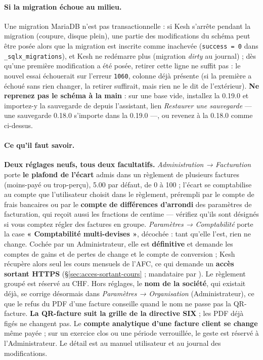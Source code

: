 \documentclass[a4paper,11pt,oneside]{article}
\begin{document}
\paragraph{Si la migration échoue au milieu.} Une migration MariaDB n'est pas transactionnelle : si Kesh s'arrête pendant la migration (coupure, disque plein), une partie des modifications du schéma peut être posée alors que la migration est inscrite comme inachevée (\texttt{success = 0} dans \texttt{\_sqlx\_migrations}), et Kesh ne redémarre plus (migration \emph{dirty} au journal) ; dès qu'une première modification a été posée, retirer cette ligne ne suffit pas : le nouvel essai échouerait sur l'erreur \texttt{1060}, colonne déjà présente (si la première a échoué sans rien changer, la retirer suffirait, mais rien ne le dit de l'extérieur). \textbf{Ne reprenez pas le schéma à la main} : sur une base vide, installez la 0.19.0 et importez-y la sauvegarde de  depuis l'assistant, lien \emph{Restaurer une sauvegarde} --- une sauvegarde 0.18.0 s'importe dans la 0.19.0 ---, ou revenez à la 0.18.0 comme ci-dessus.

\paragraph{Ce qu'il faut savoir.} \textbf{Deux réglages neufs, tous deux facultatifs.} \emph{Administration → Facturation} porte \textbf{le plafond de l'écart} admis dans un règlement de plusieurs factures (moins-payé ou trop-perçu), 5.00 par défaut, de 0 à 100 ; l'écart se comptabilise au compte que l'utilisateur choisit dans le règlement, prérempli par le compte de frais bancaires ou par le \textbf{compte de différences d'arrondi} des paramètres de facturation, qui reçoit aussi les fractions de centime --- vérifiez qu'ils sont désignés si vous comptez régler des factures en groupe. \emph{Paramètres → Comptabilité} porte la case \textbf{« Comptabilité multi-devises »}, décochée : tant qu'elle l'est, rien ne change. Cochée par un Administrateur, elle est \textbf{définitive} et demande les comptes de gains et de pertes de change et le compte de conversion ; Kesh récupère alors seul les cours mensuels de l'AFC, ce qui demande un \textbf{accès sortant HTTPS} (\S\ref{sec:acces-sortant-cours} ; mandataire par ). Le règlement groupé est réservé au CHF. Hors réglages, le \textbf{nom de la société}, qui existait déjà, se corrige désormais dans \emph{Paramètres → Organisation} (Administrateur), ce que le refus du PDF d'une facture conseille quand le nom ne passe pas la QR-facture. \textbf{La QR-facture suit la grille de la directive SIX} ; les PDF déjà figés ne changent pas. Le \textbf{compte analytique d'une facture client se change} même payée ; sur un exercice clos ou une période verrouillée, le geste est réservé à l'Administrateur. Le détail est au manuel utilisateur et au journal des modifications.
\end{document}
